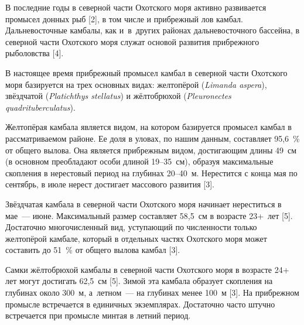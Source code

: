 



\makeProcTitleIVRazdel
{}



В последние годы в северной части Охотского моря активно развивается промысел донных рыб [2], в том числе и прибрежный лов камбал. Дальневосточные камбалы, как и~в~других районах дальневосточного бассейна, в северной части Охотского моря служат основой развития прибрежного рыболовства [4].

В настоящее время прибрежный промысел камбал в северной части Охотского моря базируется на трех основных видах: желтопёрой (\textit{Limanda aspera}), звёздчатой (\textit{Platichthys stellatus}) и жёлтобрюхой (\textit{Pleuronectes quad\-ri\-tu\-ber\-culatus}).

Желтопёрая камбала является видом, на котором базируется промысел камбал в рассматриваемом районе. Ее доля в уловах, по нашим данным, составляет 95,6~\% от общего вылова. Она является прибрежным видом, достигающим длины 49~см (в основном преобладают особи длиной 19--35~см), образуя максимальные скопления в нерестовый период на глубинах 20--40~м. Нерестится с конца мая по сентябрь, в июле нерест достигает массового развития [3].

Звёздчатая камбала в северной части Охотского моря начинает нереститься в мае~--- июне. Максимальный размер составляет 58,5~см в возрасте 23+~лет [5]. Достаточно многочисленный вид, уступающий по численности только желтопёрой камбале, который в отдельных частях Охотского моря может составить до 51~\% от общего вылова камбал [3].

Самки жёлтобрюхой камбалы в северной части Охотского моря в возрасте 24+ лет могут достигать 62,5~см [5]. Зимой эта камбала образует скопления на глубинах около 300~м, а~летном~--- на глубинах менее 100~м [3]. На прибрежном промысле встречается в единичных экземплярах. Достаточно часто штучно встречается при промысле минтая в летний период.

